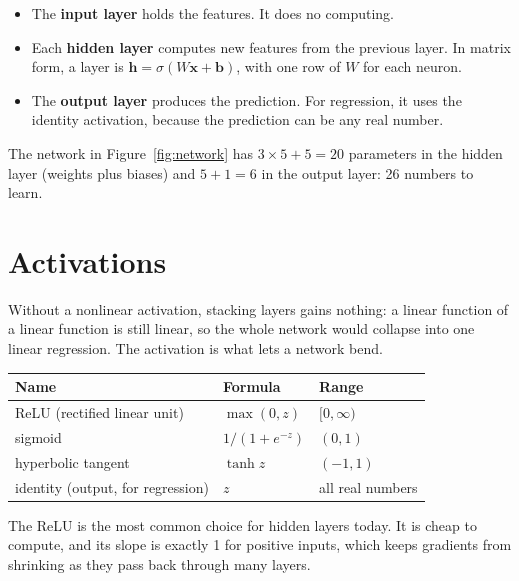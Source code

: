 \begin{itemize}
\item The \textbf{input layer} holds the features. It does no computing.
\item Each \textbf{hidden layer} computes new features from the previous layer. In matrix form, a layer is
$\mathbf{h} = \sigma(W\mathbf{x} + \mathbf{b})$, with one row of $W$ for each neuron.
\item The \textbf{output layer} produces the prediction. For regression, it uses the identity activation, because
the prediction can be any real number.
\end{itemize}

The network in Figure~\ref{fig:network} has $3 \times 5 + 5 = 20$ parameters in the hidden layer (weights plus biases)
and $5 + 1 = 6$ in the output layer: 26 numbers to learn.

\section{Activations}
Without a nonlinear activation, stacking layers gains nothing: a linear function of a linear function is still
linear, so the whole network would collapse into one linear regression. The activation is what lets a network
bend.

\begin{center}
\begin{tabular}{l l l}
\textbf{Name} & \textbf{Formula} & \textbf{Range} \\
\hline
ReLU (rectified linear unit) & $\max(0, z)$ & $[0, \infty)$ \\
sigmoid & $1/(1 + e^{-z})$ & $(0, 1)$ \\
hyperbolic tangent & $\tanh z$ & $(-1, 1)$ \\
identity (output, for regression) & $z$ & all real numbers \\
\end{tabular}
\end{center}

The ReLU is the most common choice for hidden layers today. It is cheap to compute, and its slope is
exactly 1 for positive inputs, which keeps gradients from shrinking as they pass back through many layers.

